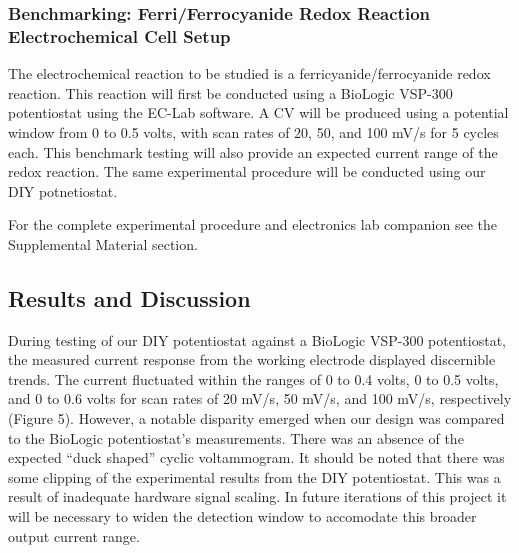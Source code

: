 \documentclass{article}
\begin{document}
\subsubsection*{Benchmarking: Ferri/Ferrocyanide Redox Reaction Electrochemical Cell Setup}

The electrochemical reaction to be studied is a ferricyanide/ferrocyanide redox reaction. This reaction will first be conducted using a BioLogic VSP-300 potentiostat using the EC-Lab software. A CV will be produced using a potential window from 0 to 0.5 volts, with scan rates of 20, 50, and 100 mV/s for 5 cycles each. This benchmark testing will also provide an expected current range of the redox reaction. The same experimental procedure will be conducted using our DIY potnetiostat.

For the complete experimental procedure and electronics lab companion see the Supplemental Material section.


\subsection*{Results and Discussion}

During testing of our DIY potentiostat against a BioLogic VSP-300 potentiostat, the measured current response from the working electrode displayed discernible trends. The current fluctuated within the ranges of 0 to 0.4 volts, 0 to 0.5 volts, and 0 to 0.6 volts for scan rates of 20 mV/s, 50 mV/s, and 100 mV/s, respectively (Figure 5). However, a notable disparity emerged when our design was compared to the BioLogic potentiostat's measurements. There was an absence of the expected “duck shaped” cyclic voltammogram. It should be noted that there was some clipping of the experimental results from the DIY potentiostat. This was a result of inadequate hardware signal scaling. In future iterations of this project it will be necessary to widen the detection window to accomodate this broader output current range.
\end{document}
